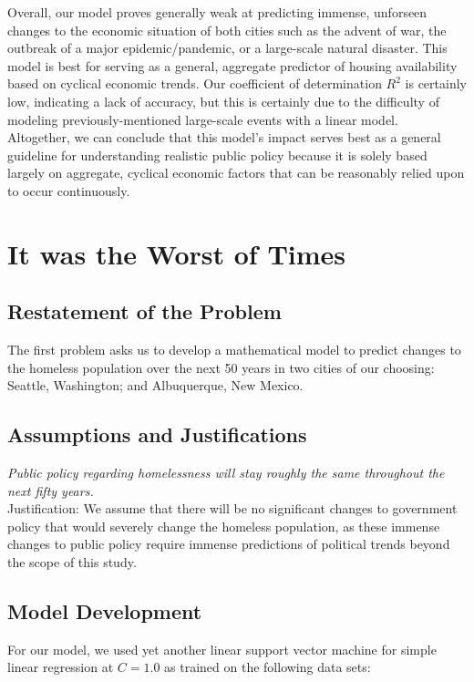 \documentclass[12pt]{article}
\begin{document}
Overall, our model proves generally weak at predicting immense, unforseen changes to the economic situation of both cities such as the advent of war, the outbreak of a major epidemic/pandemic, or a large-scale natural disaster. This model is best for serving as a general, aggregate predictor of housing availability based on cyclical economic trends. Our coefficient of determination $R^{2}$ is certainly low, indicating a lack of accuracy, but this is certainly due to the difficulty of modeling previously-mentioned large-scale events with a linear model. \\ 

\noindent
Altogether, we can conclude that this model's impact serves best as a general guideline for understanding realistic public policy because it is solely based largely on aggregate, cyclical economic factors that can be reasonably relied upon to occur continuously.

\newpage

\section{It was the Worst of Times}

\subsection{Restatement of the Problem}
The first problem asks us to develop a mathematical model to predict changes to the homeless population over the next 50
years in two cities of our choosing: Seattle, Washington; and Albuquerque, New Mexico.

\subsection{Assumptions and Justifications}
\textit{Public policy regarding homelessness will stay roughly the same throughout the next fifty years.} \\

\noindent
Justification: We assume that there will be no significant changes to government policy that would severely change the homeless population, as these immense changes to public policy require immense predictions of political trends beyond the scope of this study. \\

\subsection{Model Development}
For our model, we used yet another linear support vector machine for simple linear regression at $C=1.0$ as trained on the following data sets:
\end{document}
